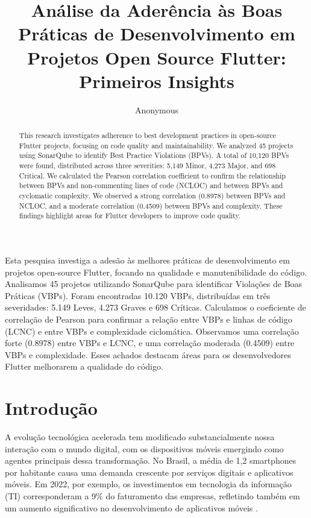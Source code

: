\documentclass[12pt]{article}
\title{Análise da Aderência às Boas Práticas de Desenvolvimento em Projetos Open Source Flutter: Primeiros Insights}
\author{Anonymous\inst{1}}
\begin{document}
 

\maketitle

\begin{abstract}
This research investigates adherence to best development practices in open-source Flutter projects, focusing on code quality and maintainability. We analyzed 45 projects using SonarQube to identify Best Practice Violations (BPVs). A total of 10,120 BPVs were found, distributed across three severities: 5,149 Minor, 4,273 Major, and 698 Critical. We calculated the Pearson correlation coefficient to confirm the relationship between BPVs and non-commenting lines of code (NCLOC) and between BPVs and cyclomatic complexity. We observed a strong correlation (0.8978) between BPVs and NCLOC, and a moderate correlation (0.4509) between BPVs and complexity. These findings highlight areas for Flutter developers to improve code quality.
\end{abstract}
     
\begin{resumo} 
Esta pesquisa investiga a adesão às melhores práticas de desenvolvimento em projetos open-source Flutter, focando na qualidade e manutenibilidade do código. Analisamos 45 projetos utilizando SonarQube para identificar Violações de Boas Práticas (VBPs). Foram encontradas 10.120 VBPs, distribuídas em três severidades: 5.149 Leves, 4.273 Graves e 698 Críticas. Calculamos o coeficiente de correlação de Pearson para confirmar a relação entre VBPs e linhas de código (LCNC) e entre VBPs e complexidade ciclomática. Observamos uma correlação forte (0.8978) entre VBPs e LCNC, e uma correlação moderada (0.4509) entre VBPs e complexidade. Esses achados destacam áreas para os desenvolvedores Flutter melhorarem a qualidade do código.
\end{resumo}

\section{Introdução}
A evolução tecnológica acelerada tem modificado substancialmente nossa interação com o mundo digital, com os dispositivos móveis emergindo como agentes principais dessa transformação. No Brasil, a média de 1,2 smartphones por habitante causa uma demanda crescente por serviços digitais e aplicativos móveis. Em 2022, por exemplo, os investimentos em tecnologia da informação (TI) corresponderam a 9\% do faturamento das empresas, refletindo também em um aumento significativo no desenvolvimento de aplicativos móveis \cite{FGVcia2023}.
\end{document}
